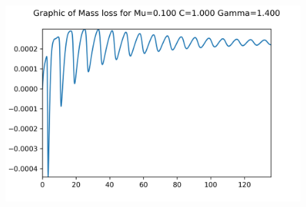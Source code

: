 \begin{figure}[H]
	\includegraphics[scale=0.65]{../graphs_data_nonsmooth_1/mass/Graph_mass_mu0.100_C1.000_gamma1.400.png}
\end{figure}


